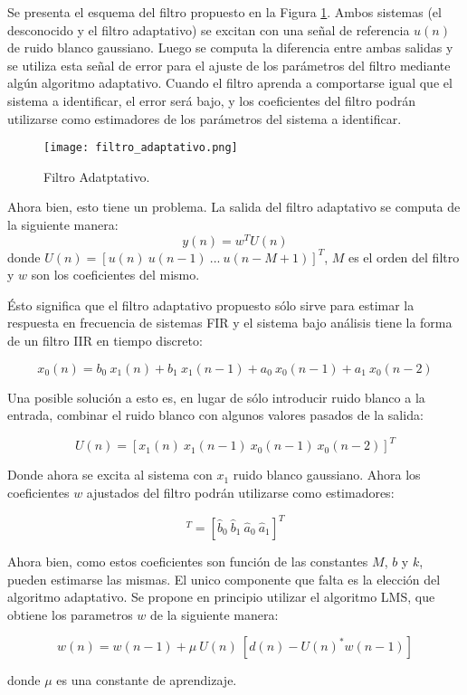 
	Se presenta el esquema del filtro propuesto en la Figura \ref{fig:filtro_adaptativo}. 
	Ambos sistemas (el desconocido y el filtro adaptativo) se excitan con una señal de referencia $u(n)$ de ruido blanco gaussiano.
	Luego se computa la diferencia entre ambas salidas y se utiliza esta señal de error para el ajuste de los parámetros del filtro mediante algún algoritmo adaptativo.
	Cuando el filtro aprenda a comportarse igual que el sistema a identificar, el error será bajo, y los coeficientes del filtro podrán utilizarse como estimadores de los parámetros del sistema a identificar.

\vspace*{\fill}
\begin{figure}[H]
\centering
\texttt{[image: filtro\_adaptativo.png]}
\caption{Filtro Adatptativo.}
\label{fig:filtro_adaptativo} 
\end{figure}
\vspace*{\fill}

Ahora bien, esto tiene un problema. La salida del filtro adaptativo se computa de la siguiente manera:
\begin{equation*}
	y(n) = w^T U(n)
\end{equation*}
donde $U(n) = [u(n) \> u(n - 1) \> ... \> u(n - M + 1)]^T$, $M$ es el orden del filtro y $w$ son los coeficientes del mismo.

	Ésto significa que el filtro adaptativo propuesto sólo sirve para estimar la respuesta en frecuencia de sistemas FIR y el sistema bajo análisis tiene la forma de un filtro IIR en tiempo discreto:

\begin{equation*}
		x_{0}(n) = b_{0} \> x_{1}(n) + b_{1} \> x_{1}(n - 1) + a_{0} \> x_{0}(n - 1) + a_{1} \> x_{0}(n - 2)
\end{equation*}

Una posible solución a esto es, en lugar de sólo introducir ruido blanco a la entrada, combinar el ruido blanco con algunos valores pasados de la salida:

\begin{equation*}
	U(n) = [x_{1}(n) \> x_{1}(n - 1) \> x_{0}(n - 1) \> x_{0}(n - 2)]^T
\end{equation*}

Donde ahora se excita al sistema con $x_{1}$ ruido blanco gaussiano. Ahora los coeficientes $w$ ajustados del filtro podrán utilizarse como estimadores:

\begin{equation*}
	[w_{0} \> w_{1} \> w_{2} \> w_{3}]^T  = [\hat{b}_{0} \> \hat{b}_{1} \> \hat{a}_{0} \> \hat{a}_{1}]^T
\end{equation*}

Ahora bien, como estos coeficientes son función de las constantes $M$, $b$ y $k$, pueden estimarse las mismas. El unico componente que falta es la elección del algoritmo adaptativo. Se propone en principio utilizar el algoritmo LMS, que obtiene los parametros $w$ de la siguiente manera:

\begin{equation*}
	w(n) = w(n - 1) + \mu \> U(n) \> [d(n) - U(n)^* w(n - 1)]
\end{equation*}

donde $\mu$ es una constante de aprendizaje.
